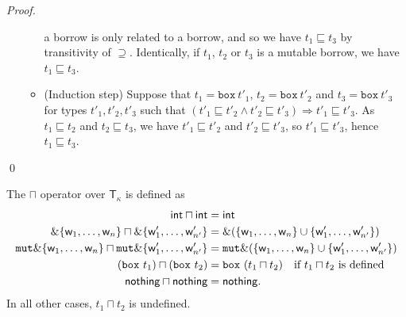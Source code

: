 \begin{proof}
\begin{itemize}
\begin{itemize}
      a borrow is only related to a borrow, and so we have
      $t_1\sqsubseteq t_3$ by transitivity of $\supseteq$.
      Identically, if $t_1$, $t_2$ or $t_3$ is a mutable borrow, we have
      $t_1\sqsubseteq t_3$.
      \item (Induction step) Suppose that $t_1=\mathtt{box}\ t'_1$,
      $t_2=\mathtt{box}\ t'_2$ and $t_3=\mathtt{box}\ t'_3$ for types
      $t'_1,t'_2,t'_3$ such that
      $(t'_1 \sqsubseteq t'_2 \land t'_2 \sqsubseteq t'_3) \Rightarrow
      t'_1 \sqsubseteq t'_3$.
      As $t_1 \sqsubseteq t_2$ and $t_2 \sqsubseteq t_3$, we have
      $t'_1 \sqsubseteq t'_2$ and $t'_2 \sqsubseteq t'_3$, so
      $t'_1 \sqsubseteq t'_3$, hence $t_1 \sqsubseteq t_3$.
    \end{itemize}
  \end{itemize}
  \qed
\end{proof}

\begin{definition}
  The $\sqcap$ operator over $\mathsf{T}_\kappa$ is defined as
  \begin{align*}
    \mathsf{int}\sqcap\mathsf{int} &= \mathsf{int}\\
    \borrow\{\mathsf{w}_1,\ldots,\mathsf{w}_n\} \sqcap \borrow\{\mathsf{w}'_1,\ldots,\mathsf{w}'_{n'}\} &= \borrow(\{\mathsf{w}_1,\ldots,\mathsf{w}_n\}\cup\{\mathsf{w}'_1,\ldots,\mathsf{w}'_{n'}\})\\
    \mathtt{mut}\borrow\{\mathsf{w}_1,\ldots,\mathsf{w}_n\} \sqcap \mathtt{mut}\borrow\{\mathsf{w}'_1,\ldots,\mathsf{w}'_{n'}\} &= \mathtt{mut}\borrow(\{\mathsf{w}_1,\ldots,\mathsf{w}_n\}\cup\{\mathsf{w}'_1,\ldots,\mathsf{w}'_{n'}\})\\
    (\mathtt{box}\ t_1) \sqcap (\mathtt{box}\ t_2) &=\mathtt{box}\ (t_1\sqcap t_2)\quad\text{if $t_1\sqcap t_2$ is defined}\\
    \mathsf{nothing}\sqcap\mathsf{nothing} &= \mathsf{nothing}.
  \end{align*}
  In all other cases, $t_1\sqcap t_2$ is undefined.
\end{definition}

